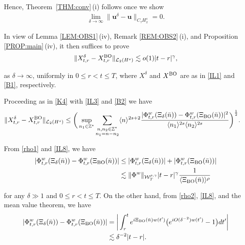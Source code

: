 \documentclass[letterpaper, 11pt,  reqno]{amsart}
\newcommand{\1}{\hspace{0.5mm}\text{I}\hspace{0.5mm}}
\newcommand{\noi}{\noindent}
\newcommand{\Z}{\mathbb{Z}}
\newcommand{\dl}{\delta}
\newcommand{\g}{\gamma}
\newcommand{\les}{\lesssim}
\newcommand{\jb}[1]
{\langle #1 \rangle}
\newcommand{\cL}{\mathcal{L}}
\newcommand{\W}{\mathcal{W}}
\newcommand{\uu}{\mathbf{u}}
\newcommand{\BO}{\text{\rm BO} }
\numberwithin{equation}{section}
\numberwithin{theorem}{section}
\begin{document}
Hence, 
Theorem~\ref{THM:conv}\,(i)
follows once we show
\begin{align}
\lim_{\dl \to \infty} \| \uu^\dl - \uu\|_{C_\tau H^s_x} = 0.
\label{ILD1b}
\end{align}

\noi
In view of 
Lemma \ref{LEM:OBS1}\,(iv), Remark \ref{REM:OBS2}\,(i), and 
Proposition \ref{PROP:main}\,(iv), 
it then suffices to prove 
\begin{align}
\|X^\dl_{t, r} - X^\BO_{t,r}\|_{\cL_2(H^s)}
\les 
o(1)|t-r|^{\g},
\label{ILD1}
\end{align}

\noi
as $\dl\to \infty$, 
uniformly in  $0 \le r < t \le T$, 
where $X^\dl$ and $X^\BO$
are as in 
\eqref{IL1} and 
\eqref{B1}, respectively.






Proceeding as in \eqref{K4} with \eqref{IL3} and \eqref{B2}
we have 
\begin{align}
\| X_{t, r}^\dl - X^\BO_{t,r} \|_{\cL_2 (H^s)}
&\leq  
\bigg(\sup_{n_1 \in \Z^*}
\sum_{\substack{n, n_2 \in \Z^*\\n_1 = n - n_2}} \jb{n}^{2s+2}
\frac{|\Phi^{w}_{t,r} (\Xi_\dl(\bar n))- \Phi^{w}_{t,r} (\Xi_\BO(\bar n)) |^2}{\jb{n_1}^{2s}\jb{n_2}^{2s}} \bigg)^\frac 12 .
\label{ILD2}
\end{align}


\noi
From 
 \eqref{rho1}  and \eqref{IL8}, we have 
\begin{align}
\begin{split}
|\Phi_{t,r}^w(\Xi_\dl (\bar n)) - \Phi_{t,r}^w(\Xi_\BO(\bar n) )|
& \le |\Phi_{t,r}^w(\Xi_\dl (\bar n))| +| \Phi_{t,r}^w(\Xi_\BO(\bar n) )|\\
& \les \|\Phi^w\|_{  \W^{\rho,\g}_T} 
|t - r|^\g
\frac 1{\jb{\Xi_\BO (\bar n)}^\rho}
\end{split}
\label{ILD3}
\end{align}

\noi
for any $\dl \gg1 $ and 
 $0 \le r < t \le T$.
On the other hand, 
from  \eqref{rho2},  \eqref{IL8}, 
and the mean value theorem, we have 
\begin{align}
\begin{aligned}
|\Phi_{t,r}^w(\Xi_\dl (\bar n)) - \Phi_{t,r}^w(\Xi_\BO(\bar n) )|
&=\bigg|
\int_r^t   e^{i \Xi_{\rm BO}  (\bar n)   w(t') } 
\big(e^{i  O(\dl^{-2})  w(t') }-1 \big)
 d t' \bigg|\\
& \les \dl^{-2}  |t- r|.
\end{aligned}
\label{ILD4}
\end{align}
\end{document}
